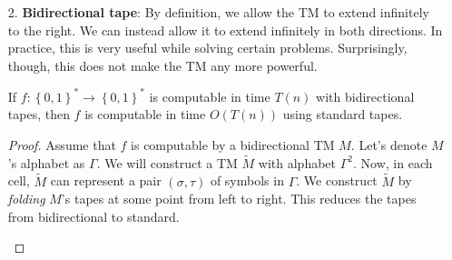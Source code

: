 \documentclass[usletter]{article}
\begin{document}
\begin{itemize}
\item[2.] \textbf{Bidirectional tape}: By definition, we allow the TM to extend infinitely to the right. We can instead allow it to extend infinitely in both directions. In practice, this is very useful while solving certain problems. Surprisingly, though, this does not 
make the TM any more powerful. 
\begin{theorem}
    If \(f: \left\{  0,1 \right\}^* \to \left\{ 0,1 \right\}^*\) is computable in time \(T(n)\) with bidirectional tapes, then \(f\) is computable in time \(O(T(n))\) using standard tapes. 
\end{theorem}

\begin{proof}
    Assume that \(f\) is computable by a bidirectional TM \(M\). Let's denote \(M\)'s alphabet as \(\Gamma\). 
    We will construct a TM \(\tilde{M}\) with alphabet \(\Gamma^2\). Now, in each cell, \(\tilde{M}\) can represent a pair \((\sigma, \tau)\) of symbols in \(\Gamma\). We construct \(\tilde{M}\) by \textit{folding} \(M\)'s tapes \cite{arorabarak} at some point from left to right. This reduces the tapes from bidirectional to standard.
    
    \begin{figure}[h]
    \centering
\end{figure}
\end{proof}
\end{itemize}
\end{document}
